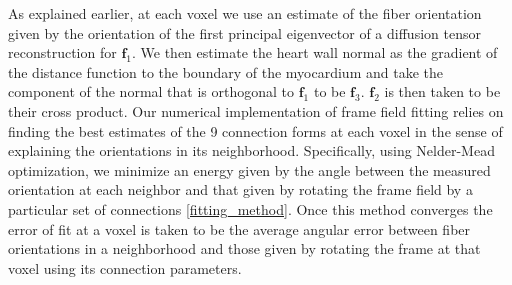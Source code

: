 As explained earlier, at each voxel we use an estimate of the fiber orientation given by the orientation of the first principal eigenvector of a diffusion tensor reconstruction for $\mathbf{f}_1$. We then estimate the heart wall normal as the gradient of the distance function to the boundary of the myocardium and take the component of the normal that is orthogonal to $\mathbf{f}_1$ to be $\mathbf{f}_3$. $\mathbf{f}_2$ is then taken to be their cross product. Our numerical implementation of frame field fitting relies on finding the best estimates of the 9 connection forms at each voxel in the sense of explaining the orientations in its neighborhood. Specifically, using Nelder-Mead optimization, we minimize an energy given by the angle between the measured orientation at each neighbor and that given by rotating the frame field by a particular set of connections \ref{fitting_method}. Once this method converges the error of fit at a voxel is taken to be the average angular error between fiber orientations in a neighborhood and those given by rotating the frame at that voxel using its connection parameters.